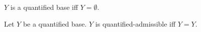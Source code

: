 \begin{definition}\label{quantified_base}
    $Y$ is a quantified base iff $Y=\emptyset$.
\end{definition}

\begin{definition}\label{quantified_admissible}
    Let $Y$ be a quantified base.
    $Y$ is quantified-admissible iff $Y=Y$.
\end{definition}

